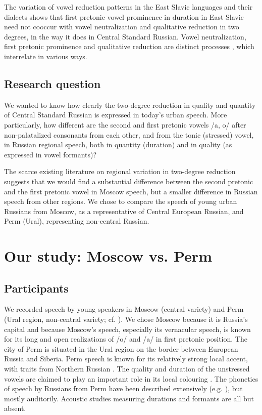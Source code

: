 \documentclass[output=paper,colorlinks,citecolor=black]{langscibook}
\begin{document}
The variation of vowel reduction patterns in the East Slavic languages and their dialects shows that first pretonic vowel prominence in duration in East Slavic need not cooccur with vowel neutralization and qualitative reduction in two degrees, in the way it does in Central Standard Russian. Vowel neutralization, first pretonic prominence and qualitative reduction are distinct processes \citep[cf.][166]{Dubina2012}, which interrelate in various ways.

\subsection{Research question}

We wanted to know how clearly the two-degree reduction in quality and quantity of Central Standard Russian is expressed in today’s urban speech. More particularly, how different are the second and first pretonic vowels /a, o/ after non-palatalized consonants from each other, and from the tonic (stressed) vowel, in Russian regional speech, both in quantity (duration) and in quality (as expressed in vowel formants)?

The scarce existing literature on regional variation in two-degree reduction suggests that we would find a substantial difference between the second pretonic and the first pretonic vowel in Moscow speech, but a smaller difference in Russian speech from other regions. We chose to compare the speech of young urban Russians from Moscow, as a representative of Central European Russian, and Perm (Ural), representing non-central Russian.

\section{Our study: Moscow vs. Perm}

\subsection{Participants}
\largerpage
We recorded speech by young speakers in Moscow (central variety) and Perm (Ural region, non-central variety; cf. \citealt{Erofeeva2005}). We chose Moscow because it is Russia’s capital and because Moscow’s speech, especially its vernacular speech, is known for its long and open realizations of /o/ and /a/ in first pretonic position. The city of Perm is situated in the Ural region on the border between European Russia and Siberia. Perm speech is known for its relatively strong local accent, with traits from Northern Russian \citep{Erofeeva2005}. The quality and duration of the unstressed vowels are claimed to play an important role in its local colouring \citep{ErofeevaEtAl2000}. The phonetics of speech by Russians from Perm have been described extensively (e.g. \citealt{Erofeeva2005}), but mostly auditorily. Acoustic studies measuring durations and formants are all but absent.
\end{document}
